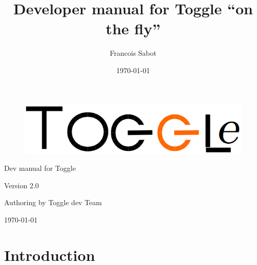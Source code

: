 \documentclass[a4paper,10pt]{report}
\title{Developer manual for Toggle ``on the fly''}
\author{Francois Sabot}
\date{\today}
\begin{document}
\begin{titlepage}



  \begin{figure}
    \begin{center}
      \includegraphics[width=1\linewidth]{images/toggleLogo.png}
    \end{center}
  \end{figure}


  \begin{center}

     \Huge{Dev manual for Toggle}
     \newline
     \newline
     \newline
  \end{center}
  
  \begin{center}
    \huge{Version 2.0}
    \newline
    \newline
    \newline
  \end{center}
  
  \begin{center}
    \huge{Authoring by Toggle dev Team}
    \newline
    \newline
    \newline
  \end{center}
  
  \begin{center}
    \large{\today}
  \end{center}

\end{titlepage}

\newpage

\tableofcontents

\chapter{Introduction}
\end{document}
